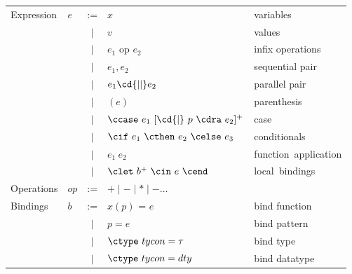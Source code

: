\begin{cluster}
\begin{definition}
\begin{tabular}{llcll}
Expression  & $e$ 
& := & $x$ & variables
\\
& & $\mid$ & $v$ & values
\\
& & $\mid$ & $e_1$ op $e_2$ & infix operations
\\
& & $\mid$ & $e_1, e_2$ & sequential pair
\\
& & $\mid$ & $e_1 \cd{||} e_2$ & parallel pair
\\
& & $\mid$ & $( e )$ & parenthesis
\\
& & $\mid$ & $\ccase~e_1~[\cd{|}~p~\cdra~e_2]^+$  & case
\\
& & $\mid$ & $\cif~e_1~\cthen~e_2~\celse~e_3$  & conditionals
\\
& & $\mid$ & $e_1~e_2$ & \mbox{function application}
\\
& & $\mid$ & $\clet~b^+~\cin~e~\cend$ & \mbox{local bindings}
\\

Operations & $op$ & := & $+ \mid - \mid * \mid - \ldots$
\\

Bindings &  $b$ & := & 
$x ( p )$ = $e$ & bind function
\\
&  & $\mid$ & $p = e$ & bind pattern
\\
&  & $\mid$ & $\ctype~tycon = \tau$ & bind type 
\\
&  & $\mid$ & $\ctype~tycon = dty$ & bind datatype
\\

\end{tabular}

\end{definition}
\end{cluster}

